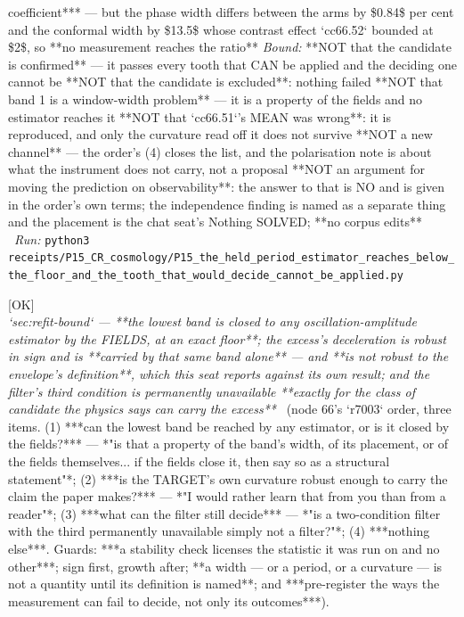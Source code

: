 \begin{description}
coefficient*** ---  but the phase width differs between the arms by \$0.84\$ per cent and the conformal width by \$13.5\$ whose contrast effect `cc66.52` bounded at \$2\$, so **no measurement reaches the ratio**
 \emph{Bound:}  **NOT that the candidate is confirmed** --- it passes every tooth that CAN be applied and the deciding one cannot be  **NOT that the candidate is excluded**: nothing failed  **NOT that band 1 is a window-width problem** --- it is a property of the fields and no estimator reaches it  **NOT that `cc66.51`'s MEAN was wrong**: it is reproduced, and only the curvature read off it does not survive  **NOT a new channel** --- the order's (4) closes the list, and the polarisation note is about what the instrument does not carry, not a proposal  **NOT an argument for moving the prediction on observability**: the answer to that is NO and is given in the order's own terms; the independence finding is named as a separate thing and the placement is the chat seat's  Nothing SOLVED; **no corpus edits**
\ \emph{Run:} \texttt{python3 receipts/P15\_CR\_cosmology/P15\_the\_held\_period\_estimator\_reaches\_below\_the\_floor\_and\_the\_tooth\_that\_would\_decide\_cannot\_be\_applied.py}
\item[\rcptlabel{P15_the_lowest_band_is_closed_by_the_fields_and_the_excess_deceleration_is_carried_by_it_alone}{P15R201}\textbf{P15R201}\quad\texttt{P15\_the\_lowest\_band\_is\_closed\_by\_the\_fields\_and\_the\_excess\_deceleration\_is\_carried\_by\_it\_alone}]\hfill\textsf{[OK]}\\
\textit{`sec:refit-bound` --- **the lowest band is closed to any oscillation-amplitude estimator by the FIELDS, at an exact floor**; the excess's deceleration is robust in sign and is **carried by that same band alone** --- and **is not robust to the envelope's definition**, which this seat reports against its own result; and the filter's third condition is permanently unavailable **exactly for the class of candidate the physics says can carry the excess**} \ (node 66's `r7003` order, three items. (1) ***can the lowest band be reached by any estimator, or is it closed by the fields?*** --- *"is that a property of the band's width, of its placement, or of the fields themselves... if the fields close it, then say so as a structural statement"*; (2) ***is the TARGET's own curvature robust enough to carry the claim the paper makes?*** --- *"I would rather learn that from you than from a reader"*; (3) ***what can the filter still decide*** --- *"is a two-condition filter with the third permanently unavailable simply not a filter?"*; (4) ***nothing else***.  Guards: ***a stability check licenses the statistic it was run on and no other***; sign first, growth after; **a width --- or a period, or a curvature --- is not a quantity until its definition is named**; and ***pre-register the ways the measurement can fail to decide, not only its outcomes***). 

\end{description}
